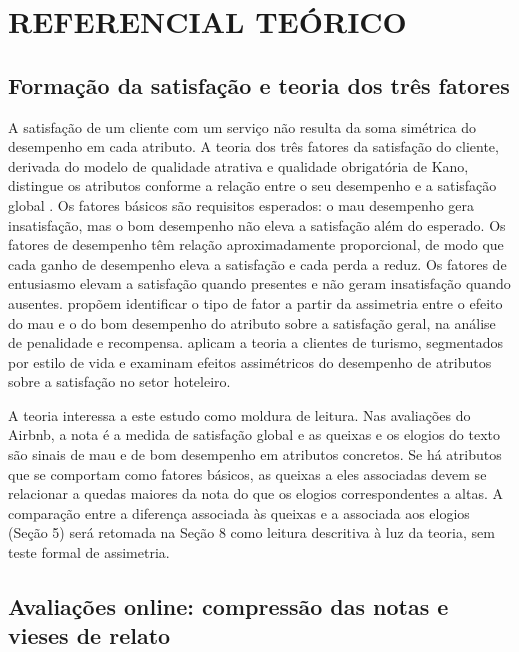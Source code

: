 \section{REFERENCIAL TEÓRICO}

\subsection{Formação da satisfação e teoria dos três fatores}

A satisfação de um cliente com um serviço não resulta da soma simétrica do desempenho em cada atributo. A teoria dos três fatores da satisfação do cliente, derivada do modelo de qualidade atrativa e qualidade obrigatória de Kano, distingue os atributos conforme a relação entre o seu desempenho e a satisfação global \citep{matzler2002,fuller2008}. Os fatores básicos são requisitos esperados: o mau desempenho gera insatisfação, mas o bom desempenho não eleva a satisfação além do esperado. Os fatores de desempenho têm relação aproximadamente proporcional, de modo que cada ganho de desempenho eleva a satisfação e cada perda a reduz. Os fatores de entusiasmo elevam a satisfação quando presentes e não geram insatisfação quando ausentes. \citet{matzler2002} propõem identificar o tipo de fator a partir da assimetria entre o efeito do mau e o do bom desempenho do atributo sobre a satisfação geral, na análise de penalidade e recompensa. \citet{fuller2008} aplicam a teoria a clientes de turismo, segmentados por estilo de vida e \citet{bi2020} examinam efeitos assimétricos do desempenho de atributos sobre a satisfação no setor hoteleiro.

A teoria interessa a este estudo como moldura de leitura. Nas avaliações do Airbnb, a nota é a medida de satisfação global e as queixas e os elogios do texto são sinais de mau e de bom desempenho em atributos concretos. Se há atributos que se comportam como fatores básicos, as queixas a eles associadas devem se relacionar a quedas maiores da nota do que os elogios correspondentes a altas. A comparação entre a diferença associada às queixas e a associada aos elogios (Seção 5) será retomada na Seção 8 como leitura descritiva à luz da teoria, sem teste formal de assimetria.

\subsection{Avaliações online: compressão das notas e vieses de relato}

